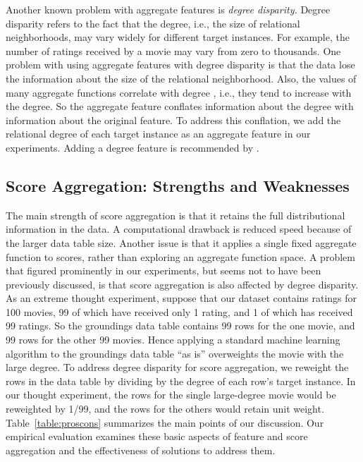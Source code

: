 \documentclass[conference]{IEEEtran}
\begin{document}
Another known problem with aggregate features is {\em degree disparity.} Degree disparity refers to the fact that the degree, i.e., the size of relational neighborhoods, may vary widely for different target instances. For example, the number of ratings received by a movie may vary from zero to thousands. One problem with using aggregate features with degree disparity is that the data lose the information about the size of the relational neighborhood. Also, the values of many aggregate functions correlate with degree \cite{Jensen2003}, i.e., they tend to increase with the degree. So the aggregate feature conflates information about the degree with information about the original feature. To address this conflation, we add the relational degree of each target instance as an aggregate feature in our experiments. Adding a degree feature is recommended by \cite{Jensen2003}.

\subsection{Score Aggregation: Strengths and Weaknesses} The main strength of score aggregation is that it retains the full distributional information in the data. A computational drawback is reduced speed because of the larger data table size. Another issue is that it applies a single fixed aggregate function to scores, rather than exploring an aggregate function space. A problem that figured prominently in our experiments, but seems not to have been previously discussed, is that score aggregation is also affected by degree disparity. As an extreme thought experiment, suppose that our dataset contains ratings for 100 movies, 99 of which have received only 1 rating, and 1 of which has received 99 ratings. So the groundings data table contains 99 rows for the one movie, and 99 rows for the other 99 movies. Hence applying a standard machine learning algorithm to the groundings data table ``as is'' overweights the movie with the large degree. To address degree disparity for score aggregation, we reweight the rows in the data table by dividing by the degree of each row's target instance. In our thought experiment, the rows for the single large-degree movie would be reweighted by 1/99, and the rows for the others would retain unit weight. Table~\ref{table:proscons} summarizes the main points of our discussion.
Our empirical evaluation examines these basic aspects of feature and score aggregation and the effectiveness of solutions to address them.
\end{document}
